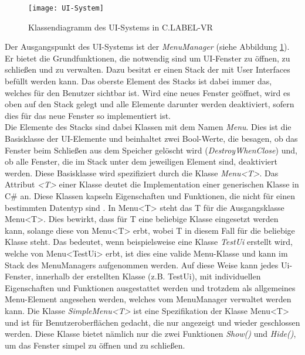 \begin{figure}%
	\centering
    \texttt{[image: UI-System]}
    \caption{Klassendiagramm des UI-Systems in C.LABEL-VR}
    \label{fig:UI-System}
\end{figure}

Der Ausgangspunkt des UI-Systems ist der \textit{MenuManager} (siehe Abbildung \ref{fig:UI-System}). Er bietet die Grundfunktionen, die notwendig sind um UI-Fenster zu öffnen, zu schließen und zu verwalten. Dazu besitzt er einen Stack der mit User Interfaces befüllt werden kann. Das oberste Element des Stacks ist dabei immer das, welches für den Benutzer sichtbar ist. Wird eine neues Fenster geöffnet, wird es oben auf den Stack gelegt und alle Elemente darunter werden deaktiviert, sofern dies für das neue Fenster so implementiert ist.\\

Die Elemente des Stacks sind dabei Klassen mit dem Namen \textit{Menu}. Dies ist die Basisklasse der UI-Elemente und beinhaltet zwei Bool-Werte, die besagen, ob das Fenster beim Schließen aus dem Speicher gelöscht wird (\textit{DestroyWhenClose}) und, ob alle Fenster, die im Stack unter dem jeweiligen Element sind, deaktiviert werden. Diese Basisklasse wird spezifiziert durch die Klasse \textit{Menu<T>}. Das Attribut \textit{<T>} einer Klasse deutet die Implementation einer generischen Klasse in C\# an. Diese Klassen kapseln Eigenschaften und Funktionen, die nicht für einen bestimmten Datentyp sind \cite{bib:Generics}. In Menu<T> steht das T für die Ausgangsklasse Menu<T>. Dies bewirkt, dass für T eine beliebige Klasse eingesetzt werden kann, solange diese von Menu<T> erbt, wobei T in diesem Fall für die beliebige Klasse steht. Das bedeutet, wenn beispielsweise eine Klasse \textit{TestUi} erstellt wird, welche von Menu<TestUi> erbt, ist dies eine valide Menu-Klasse und kann im Stack des MenuManagers aufgenommen werden. Auf diese Weise kann jedes Ui-Fenster, innerhalb der erstellten Klasse (z.B. TestUi),  mit individuellen Eigenschaften und Funktionen ausgestattet werden und trotzdem als allgemeines Menu-Element angesehen werden, welches vom MenuManager verwaltet werden kann. Die Klasse \textit{SimpleMenu<T>} ist eine Spezifikation der Klasse Menu<T> und ist für Benutzeroberflächen gedacht, die nur angezeigt und wieder geschlossen werden. Diese Klasse bietet nämlich nur die zwei Funktionen \textit{Show()} und \textit{Hide()}, um das Fenster simpel zu öffnen und zu schließen.\\

